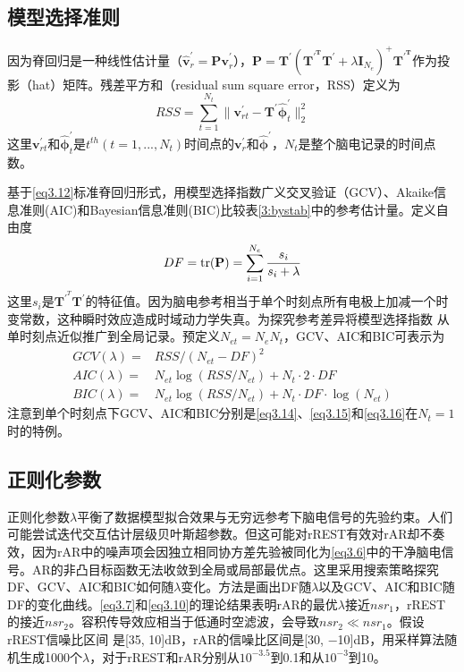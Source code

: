 \subsection{模型选择准则}
因为脊回归是一种线性估计量（$\hat{\mathbf{v}}^\prime_r={\mathbf{Pv}^\prime_r}$），$\mathbf{P}=\mathbf{T}^\prime(\mathbf{T^{\prime^T}}\mathbf{T}^\prime+\lambda\mathbf{I}_{N_{e}})^{+}\mathbf{T^{\prime^T}}$作为投影（hat）矩阵。残差平方和（residual sum square error，RSS）定义为
\begin{equation}
RSS=\sum_{t=1}^{N_{t}}\lVert\mathbf{v}^\prime_{rt}-\mathbf{T}^\prime\hat{\mathbf{\phi}}^\prime_t\rVert_2^2
\end{equation}
这里$\mathbf{v}^\prime_{rt}$和$\hat{\mathbf{\phi}}^\prime_t$是$t^{th}(t=1,...,N_t)$时间点的$\mathbf{v}^\prime_r$和$\hat{\mathbf{\phi}}^\prime$，$N_t$是整个脑电记录的时间点数。

基于\eqref{eq3.12}标准脊回归形式，用模型选择指数广义交叉验证（GCV）、Akaike信息准则(AIC)和Bayesian信息准则(BIC)比较表\ref{3:bystab}中的参考估计量。定义自由度
\begin{equation}
DF=\operatorname{tr}(\mathbf{P})=\sum_{i=1}^{N_{e}}\dfrac{s_i}{s_i+\lambda}
\end{equation}
这里$s_i$是$\mathbf{T}^{\prime^T}\mathbf{T}^\prime$的特征值。因为脑电参考相当于单个时刻点所有电极上加减一个时变常数，这种瞬时效应造成时域动力学失真。为探究参考差异将模型选择指数
从单时刻点近似推广到全局记录。预定义$N_{et}=N_eN_t$，GCV、AIC和BIC可表示为
\begin{align}
GCV(\lambda)={} &RSS/(N_{et}-DF)^2\label{eq3.14}\\
AIC(\lambda)={} &N_{et}\log(RSS/{N_{et}})+N_t\cdot{2}\cdot{DF}\label{eq3.15}\\
BIC(\lambda)={} &N_{et}\log(RSS/{N_{et}})+N_t\cdot{DF}\cdot{\log(N_{et})}\label{eq3.16}
\end{align}
注意到单个时刻点下GCV、AIC和BIC分别是\eqref{eq3.14}、\eqref{eq3.15}和\eqref{eq3.16}在$N_t=1$时的特例。
\subsection{正则化参数}
正则化参数$\lambda$平衡了数据模型拟合效果与无穷远参考下脑电信号的先验约束。人们可能尝试迭代交互估计层级贝叶斯超参数。但这可能对rREST有效对rAR却不奏效，因为rAR中的噪声项会因独立相同协方差先验被同化为\eqref{eq3.6}中的干净脑电信号。AR的非凸目标函数无法收敛到全局或局部最优点。这里采用搜索策略探究DF、GCV、AIC和BIC如何随$\lambda$变化。方法是画出DF随$\lambda$以及GCV、AIC和BIC随DF的变化曲线。\eqref{eq3.7}和\eqref{eq3.10}的理论结果表明rAR的最优$\lambda$接近$nsr_1$，rREST的接近$nsr_2$。容积传导效应相当于低通时空滤波，会导致$nsr_2\ll{nsr_1}$。假设rREST信噪比区间
是[35, 10]dB，rAR的信噪比区间是[30, −10]dB，用采样算法随机生成1000个$\lambda$，对于rREST和rAR分别从$10^{-3.5}$到0.1和从$10^{-3}$到10。

